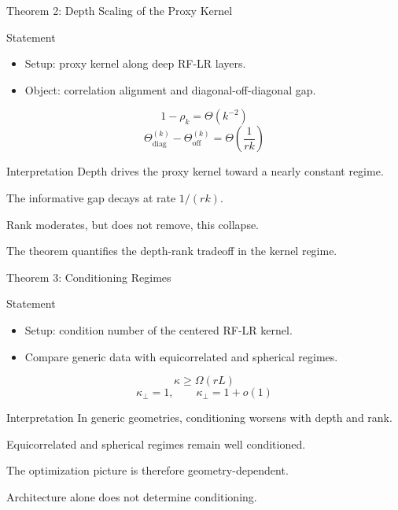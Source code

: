 \documentclass[aspectratio=169]{beamer}
\begin{document}
\begin{frame}{Theorem 2: Depth Scaling of the Proxy Kernel}
  \small
  \begin{block}{Statement}
    \begin{itemize}
      \item Setup: proxy kernel along deep RF-LR layers.
      \item Object: correlation alignment and diagonal-off-diagonal gap.
    \end{itemize}
    \[
    1-\rho_k=\Theta(k^{-2})
    \]
    \[
    \Theta_{\mathrm{diag}}^{(k)}-\Theta_{\mathrm{off}}^{(k)}
    =\Theta\!\left(\frac{1}{rk}\right)
    \]
  \end{block}
  \begin{alertblock}{Interpretation}
    Depth drives the proxy kernel toward a nearly constant regime.

    The informative gap decays at rate $1/(rk)$.

    Rank moderates, but does not remove, this collapse.

    The theorem quantifies the depth-rank tradeoff in the kernel regime.
  \end{alertblock}
\end{frame}

\begin{frame}{Theorem 3: Conditioning Regimes}
  \small
  \begin{block}{Statement}
    \begin{itemize}
      \item Setup: condition number of the centered RF-LR kernel.
      \item Compare generic data with equicorrelated and spherical regimes.
    \end{itemize}
    \[
    \kappa \ge \Omega(rL)
    \]
    \[
    \kappa_{\perp}=1,\qquad \kappa_{\perp}=1+o(1)
    \]
  \end{block}
  \begin{alertblock}{Interpretation}
    In generic geometries, conditioning worsens with depth and rank.

    Equicorrelated and spherical regimes remain well conditioned.

    The optimization picture is therefore geometry-dependent.

    Architecture alone does not determine conditioning.
  \end{alertblock}
\end{frame}
\end{document}
